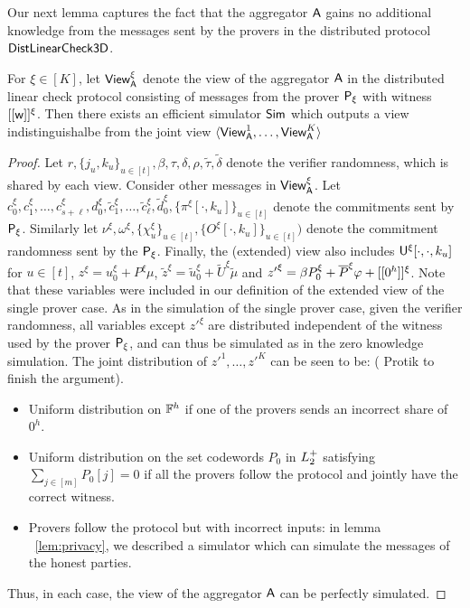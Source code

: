 Our next lemma captures the fact that the aggregator $\mathsf{A}$ gains no additional
knowledge from the messages sent by the provers in the distributed protocol
$\mathsf{DistLinearCheck3D}$. 

\begin{lemma}\label{lem:distlincheckzk}
For $\xi\in [K]$, let $\mathsf{View}^\xi_{\mathsf{A}}$ denote the view of the aggregator $\mathsf{A}$ in the distributed
linear check protocol consisting of messages from the prover $\mathsf{P}_\xi$ with
witness $[[{\mathsf{w}}]]^\xi$. Then there exists an efficient simulator $\mathsf{Sim}$
which outputs a view indistinguishalbe from the joint view $\langle
\mathsf{View}^1_{\mathsf{A}},\ldots,\mathsf{View}^K_{\mathsf{A}}\rangle$ 
\end{lemma}
\begin{proof}

Let $r,\{j_u,k_u\}_{u\in
[t]},\beta,\tau,\delta,\rho,\tilde{\tau},\tilde{\delta}$ denote the verifier
randomness, which is shared by each view. Consider other messages in
$\mathsf{View}^\xi_{\mathsf{A}}$. Let 
$c_0^\xi,c_1^\xi,\ldots,c_{s+\ell}^\xi,d_0^\xi,\tilde{c}_1^\xi,\ldots,\tilde{c}_\ell^\xi,\tilde{d}_0^\xi,\{\pi^\xi[\cdot,k_u]\}_{u\in
[t]}$ denote the commitments sent by $\mathsf{P}_\xi$. Similarly let 
$\nu^\xi,\omega^\xi,\{\chi^\xi_u\}_{u\in [t]},\{O^\xi[\cdot,k_u]\}_{u\in [t]})$
denote the commitment randomness sent by the $\mathsf{P}_\xi$. Finally, the
(extended) view also includes $\mathsf{U}^\xi[\cdot,\cdot,k_u]$ for $u\in [t]$,
$z^\xi=u_0^\xi+P^\xi\mu$,
$\tilde{z}^\xi=\tilde{u}^\xi_0+\tilde{U}^\xi\tilde{\mu}$ and ${z'}^\xi=\beta
P^\xi_0 + \overline{P}^\xi\varphi + [[{0^h}]]^\xi$. Note that these variables were
included in our definition of the extended view of the single prover case. As in the simulation of the
single prover case, given the verifier randomness, all variables except
${z'}^\xi$ are distributed independent of the witness used by the prover
$\mathsf{P}_\xi$, and can thus be simulated as in the zero knowledge simulation.
The joint distribution of ${z'}^1,\ldots,{z'}^K$ can be seen to be:
({\color{red} Protik to finish the argument}).
\begin{itemize}
\item Uniform distribution on $\mathbb{F}^h$ if one of the provers sends an incorrect
share of $0^h$.
\item Uniform distribution on the set codewords $P_0$ in $L^{+}_2$ satisfying
$\sum_{j\in [m]}P_0[j]=0$ if all the provers follow the protocol and
jointly have the correct witness.
\item Provers follow the protocol but with incorrect inputs: in lemma ~\ref{lem:privacy}, we described a simulator which can simulate the messages of the honest parties. 
\end{itemize}

Thus, in each case, the view of the aggregator $\mathsf{A}$ can be perfectly simulated.
\end{proof}
